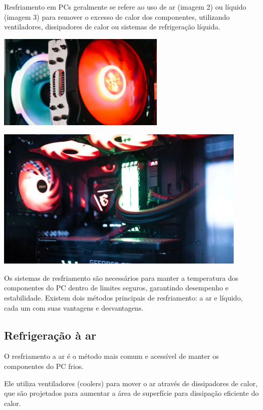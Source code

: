 \documentclass[12pt]{article}
\begin{document}
Resfriamento em PCs geralmente se refere ao uso de ar (imagem 2) ou líquido (imagem 3) para remover o excesso de calor dos componentes, utilizando ventiladores, dissipadores de calor ou sistemas de refrigeração líquida.
\begin{adjustbox}{center,caption={Air Cooler de computador em detalhe},nofloat=figure,vspace=\bigskipamount}
    \includegraphics[width=8cm]{cooler.png}

\end{adjustbox}
\begin{adjustbox}{center,caption={Computador Gamer que utiliza refrigeração liquida},nofloat=figure,vspace=\bigskipamount}
    \includegraphics[width=12cm]{gaymer.png}
\end{adjustbox}
Os sistemas de resfriamento são necessários para manter a temperatura dos componentes do PC dentro de limites seguros, garantindo desempenho e estabilidade. Existem dois métodos principais de resfriamento: a ar e líquido, cada um com suas vantagens e desvantagens.
\subsection{Refrigeração à ar}
O resfriamento a ar é o método mais comum e acessível de manter os componentes do PC frios. 

Ele utiliza ventiladores (coolers) para mover o ar através de dissipadores de calor, que são projetados para aumentar a área de superfície para dissipação eficiente do calor. 
\end{document}
